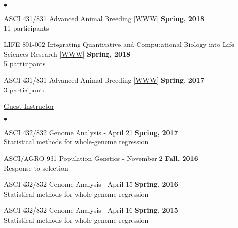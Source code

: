 \documentclass[margin,line,10pt]{res}
\newenvironment{list2}{
  \begin{list}{$\bullet$}{%
      \setlength{\itemsep}{0in}
      \setlength{\parsep}{0in} \setlength{\parskip}{0in}
      \setlength{\topsep}{0in} \setlength{\partopsep}{0in} 
      \setlength{\leftmargin}{0.2in}}}{\end{list}}
\begin{document}
\begin{resume}
\begin{list2}
\vspace{0.5cm}
  
\item ASCI 431/831 Advanced Animal Breeding [\textcolor{blue}{\href{http://morotalab.org/asci431-2018/ASCI431-831.html}{WWW}}]
  \hfill {\bf Spring, 2018} \\
  11 participants 

  \vspace{0.5cm}

\item LIFE 891-002 Integrating Quantitative and Computational Biology into Life Sciences Research [\textcolor{blue}{\href{http://morotalab.org/life431-2018/life431-831.html}{WWW}}]
  \hfill {\bf Spring, 2018}  \\
 5 participants  

 \vspace{0.5cm}

\item ASCI 431/831 Advanced Animal Breeding [\textcolor{blue}{\href{http://morotalab.org/asci431-2017/ASCI431-831.html}{WWW}}]
  \hfill {\bf Spring, 2017}  \\
 3 participants 
\end{list2}

 \vspace{.01pt}

\underline{Guest Instructor}
 \vspace{0.4cm}
 \begin{list2}
 \item ASCI 432/832 Genome Analysis - April 21  \hfill {\bf Spring, 2017} \\
   Statistical methods for whole-genome regression
\vspace{0.5cm}
\item ASCI/AGRO 931  Population Genetics - November 2  \hfill {\bf Fall, 2016} \\
  Response to selection
\vspace{0.5cm}
\item ASCI 432/832 Genome Analysis - April 15  \hfill {\bf Spring, 2016} \\
  Statistical methods for whole-genome regression
\vspace{0.5cm}
\item ASCI 432/832 Genome Analysis - April 16    \hfill {\bf Spring, 2015} \\
  Statistical methods for whole-genome regression
\end{list2}


  \vspace{1cm}


\end{resume}
\end{document}
